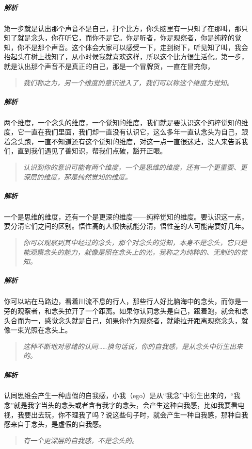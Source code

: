 \subparagraph{解析} 第一步就是认出那个声音不是自己，打个比方，你头脑里有一只知了在那叫，那只知了就是念头，你在听它，而你不是它。你是听者，你是观察者，你是纯粹的觉知，你不是那个声音。这个体会大家可以感受一下，走到树下，听见知了叫，我会抬起头在树上找知了，从小时候我就喜欢这样，所以这个比方很生活化。第一步，就是认出那个声音不是真正的自己，那是一个冒牌货，一直在冒充你，

\begin{quote}\it
    我们称之为，另一个维度的意识进入了，我们可以称这个维度为觉知。
\end{quote}

\subparagraph{解析} 两个维度，一个念头的维度，一个觉知的维度，我们就是要认识这个纯粹觉知的维度，它一直在我们里面，我们却一直没有认识它，这么多年一直认念头为自己，跟着念头跑，一直不知道还有这个觉知的维度，对这一点一直很迷茫，没人来告诉我们，直到我们遇见了善知识，帮我们点破，豁开正眼。

\begin{quote}\it
    认识到你的意识可能有两个维度，一个是思维的维度，还有一个更重要、更深层的维度，那是纯然觉知的维度。
\end{quote}

\subparagraph{解析} 一个是思维的维度，还有一个是更深的维度——纯粹觉知的维度。要认识这一点，要分清它们之间的区别。悟性高的人很快就能分清，悟性差的人可能需要好几年。

\begin{quote}\it
    你可以观察到其中经过的念头，那个对念头的觉知，本身不是念头，它只是能观察念头的能力，就像是照在念头上的光，我称之为纯粹的、无制约的觉知。
\end{quote}

\subparagraph{解析} 你可以站在马路边，看着川流不息的行人，那些行人好比脑海中的念头，而你是一旁的观察者，和念头拉开了一个距离。如果你认同念头是自己，跟着跑，就会和念头合而为一，感觉念头就是自己，如果你作为观察者，就能拉开距离观察念头，就像一束光照在念头上。

\begin{quote}\it
    这种不断地对思绪的认同……换句话说，你的自我感，是从念头中衍生出来的。
\end{quote}

\subparagraph{解析} 认同思维会产生一种虚假的自我感，小我（ego）是从“我念”中衍生出来的，“我念”就是我字当头的念头或者含有我字的念头，会产生这种自我感，比如我要看电视，我要出去玩，你不理我了吗？说这些句子时，就会产生一种自我感，那种自我感来自于念头，是虚假的自我感。

\begin{quote}\it
    有一个更深层的自我感，不是念头的。
\end{quote}

